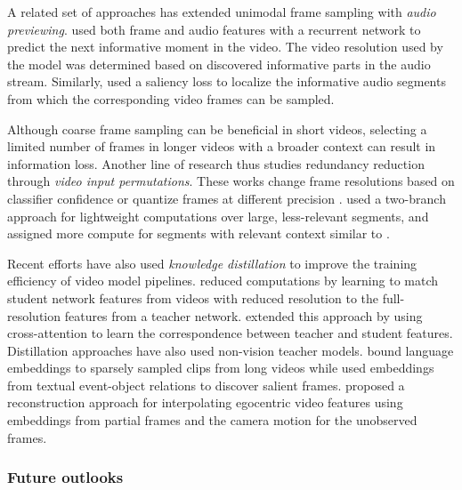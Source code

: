 A related set of approaches has extended unimodal frame sampling with \emph{audio previewing}.  used both frame and audio features with a recurrent network to predict the next informative moment in the video. The video resolution used by the model was determined based on discovered informative parts in the audio stream. Similarly,  used a saliency loss to localize the informative audio segments from which the corresponding video frames can be sampled. 

Although coarse frame sampling can be beneficial in short videos, selecting a limited number of frames in longer videos with a broader context can result in information loss. Another line of research thus studies redundancy reduction through \emph{video input permutations}. These works change frame resolutions based on classifier confidence  or quantize frames at different precision .  used a two-branch approach for lightweight computations over large, less-relevant segments, and assigned more compute for segments with relevant context similar to .  

Recent efforts have also used \emph{knowledge distillation} to improve the training efficiency of video model pipelines.  reduced computations by learning to match student network features from videos with reduced resolution to the full-resolution features from a teacher network.  extended this approach by using cross-attention to learn the correspondence between teacher and student features. Distillation approaches have also used non-vision teacher models.  bound language embeddings to sparsely sampled clips from long videos while  used embeddings from textual event-object relations to discover salient frames.  proposed a reconstruction approach for interpolating egocentric video features using embeddings from partial frames and the camera motion for the unobserved frames.

\subsubsection{Future outlooks}
\label{sec:recognition::outlooks}

